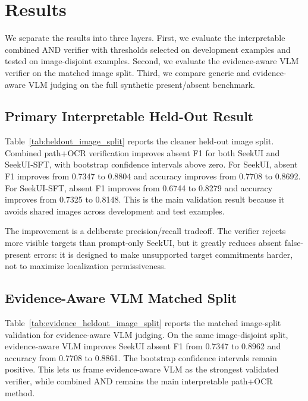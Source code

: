 \section{Results}

We separate the results into three layers. First, we evaluate the interpretable combined AND verifier with thresholds selected on development examples and tested on image-disjoint examples. Second, we evaluate the evidence-aware VLM verifier on the matched image split. Third, we compare generic and evidence-aware VLM judging on the full synthetic present/absent benchmark.

\subsection{Primary Interpretable Held-Out Result}

Table~\ref{tab:heldout_image_split} reports the cleaner held-out image split. Combined path+OCR verification improves absent F1 for both SeekUI and SeekUI-SFT, with bootstrap confidence intervals above zero. For SeekUI, absent F1 improves from 0.7347 to 0.8804 and accuracy improves from 0.7708 to 0.8692. For SeekUI-SFT, absent F1 improves from 0.6744 to 0.8279 and accuracy improves from 0.7325 to 0.8148. This is the main validation result because it avoids shared images across development and test examples.

The improvement is a deliberate precision/recall tradeoff. The verifier rejects more visible targets than prompt-only SeekUI, but it greatly reduces absent false-present errors: it is designed to make unsupported target commitments harder, not to maximize localization permissiveness.



\subsection{Evidence-Aware VLM Matched Split}

Table~\ref{tab:evidence_heldout_image_split} reports the matched image-split validation for evidence-aware VLM judging. On the same image-disjoint split, evidence-aware VLM improves SeekUI absent F1 from 0.7347 to 0.8962 and accuracy from 0.7708 to 0.8861. The bootstrap confidence intervals remain positive. This lets us frame evidence-aware VLM as the strongest validated verifier, while combined AND remains the main interpretable path+OCR method.

